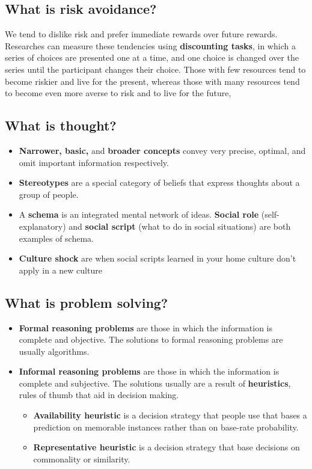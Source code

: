 \documentclass[10pt,letter]{article}
\theoremstyle{plain}
\theoremstyle{definition}
\begin{document}
\subsection*{What is risk avoidance?}
We tend to dislike risk and prefer immediate rewards over future rewards. Researches can measure these tendencies using \textbf{discounting tasks}, in which a series of choices are presented one at a time, and one choice is changed over the series until the participant changes their choice. Those with few resources tend to become riskier and live for the present, whereas those with many resources tend to become even more averse to risk and to live for the future, 

\subsection*{What is thought?}
\begin{itemize}
    \item \textbf{Narrower, basic,} and \textbf{broader concepts} convey very precise, optimal, and omit important information respectively. 
    \item \textbf{Stereotypes} are a special category of beliefs that express thoughts about a group of people. 
    \item A \textbf{schema} is an integrated mental network of ideas. \textbf{Social role} (self-explanatory) and \textbf{social script} (what to do in social situations) are both examples of schema. 
    \item \textbf{Culture shock} are when social scripts learned in your home culture don't apply in a new culture
\end{itemize}


\subsection*{What is problem solving?}
\begin{itemize}
    \item \textbf{Formal reasoning problems} are those in which the information is complete and objective. The solutions to formal reasoning problems are usually algorithms. 
    \item \textbf{Informal reasoning problems} are those in which the information is complete and subjective. The solutions usually are a result of \textbf{heuristics}, rules of thumb that aid in decision making. \begin{itemize}
        \item \textbf{Availability heuristic} is a decision strategy that people use that bases a prediction on memorable instances rather than on base-rate probability. 
        \item \textbf{Representative heuristic} is a decision strategy that base decisions on commonality or similarity. 
    \end{itemize}
\end{itemize}
\end{document}
